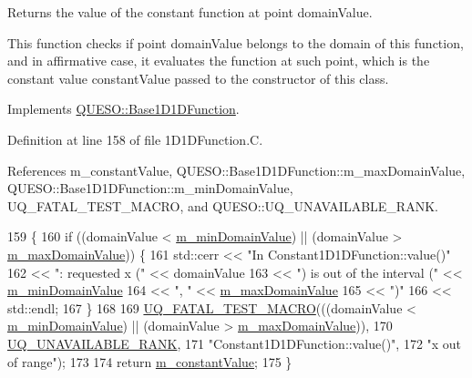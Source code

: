 Returns the value of the constant function at point {\ttfamily domain\-Value}. 

This function checks if point {\ttfamily domain\-Value} belongs to the domain of {\ttfamily this} function, and in affirmative case, it evaluates the function at such point, which is the constant value {\ttfamily constant\-Value} passed to the constructor of this class. 

Implements \hyperlink{class_q_u_e_s_o_1_1_base1_d1_d_function_a1042dfd930c30a35d6dbf70f94e8dfe5}{Q\-U\-E\-S\-O\-::\-Base1\-D1\-D\-Function}.



Definition at line 158 of file 1\-D1\-D\-Function.\-C.



References m\-\_\-constant\-Value, Q\-U\-E\-S\-O\-::\-Base1\-D1\-D\-Function\-::m\-\_\-max\-Domain\-Value, Q\-U\-E\-S\-O\-::\-Base1\-D1\-D\-Function\-::m\-\_\-min\-Domain\-Value, U\-Q\-\_\-\-F\-A\-T\-A\-L\-\_\-\-T\-E\-S\-T\-\_\-\-M\-A\-C\-R\-O, and Q\-U\-E\-S\-O\-::\-U\-Q\-\_\-\-U\-N\-A\-V\-A\-I\-L\-A\-B\-L\-E\-\_\-\-R\-A\-N\-K.


\begin{DoxyCode}
159 \{
160   \textcolor{keywordflow}{if} ((domainValue < \hyperlink{class_q_u_e_s_o_1_1_base1_d1_d_function_a7b18b3854ee74ef5befbc67b75ebbdc5}{m\_minDomainValue}) || (domainValue > 
      \hyperlink{class_q_u_e_s_o_1_1_base1_d1_d_function_aa0025999ccab2145cd46c0a81e260e8f}{m\_maxDomainValue})) \{
161     std::cerr << \textcolor{stringliteral}{"In Constant1D1DFunction::value()"}
162               << \textcolor{stringliteral}{": requested x ("}            << domainValue
163               << \textcolor{stringliteral}{") is out of the interval ("} << \hyperlink{class_q_u_e_s_o_1_1_base1_d1_d_function_a7b18b3854ee74ef5befbc67b75ebbdc5}{m\_minDomainValue}
164               << \textcolor{stringliteral}{", "}                         << \hyperlink{class_q_u_e_s_o_1_1_base1_d1_d_function_aa0025999ccab2145cd46c0a81e260e8f}{m\_maxDomainValue}
165               << \textcolor{stringliteral}{")"}
166               << std::endl;
167   \}
168 
169   \hyperlink{_defines_8h_a56d63d18d0a6d45757de47fcc06f574d}{UQ\_FATAL\_TEST\_MACRO}(((domainValue < \hyperlink{class_q_u_e_s_o_1_1_base1_d1_d_function_a7b18b3854ee74ef5befbc67b75ebbdc5}{m\_minDomainValue}) || (domainValue 
      > \hyperlink{class_q_u_e_s_o_1_1_base1_d1_d_function_aa0025999ccab2145cd46c0a81e260e8f}{m\_maxDomainValue})),
170                       \hyperlink{namespace_q_u_e_s_o_a7d4679800a430ae8e473c1c7bc0bfb21}{UQ\_UNAVAILABLE\_RANK},
171                       \textcolor{stringliteral}{"Constant1D1DFunction::value()"},
172                       \textcolor{stringliteral}{"x out of range"});
173 
174   \textcolor{keywordflow}{return} \hyperlink{class_q_u_e_s_o_1_1_constant1_d1_d_function_aa5aa0e15e78cc350f49894279f896cf6}{m\_constantValue};
175 \}
\end{DoxyCode}



